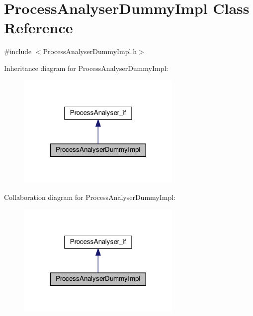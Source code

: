 \hypertarget{class_process_analyser_dummy_impl}{}\section{Process\+Analyser\+Dummy\+Impl Class Reference}
\label{class_process_analyser_dummy_impl}


{\ttfamily \#include $<$Process\+Analyser\+Dummy\+Impl.\+h$>$}



Inheritance diagram for Process\+Analyser\+Dummy\+Impl\+:\nopagebreak
\begin{figure}[H]
\begin{center}
\leavevmode
\includegraphics[width=224pt]{class_process_analyser_dummy_impl__inherit__graph}
\end{center}
\end{figure}


Collaboration diagram for Process\+Analyser\+Dummy\+Impl\+:\nopagebreak
\begin{figure}[H]
\begin{center}
\leavevmode
\includegraphics[width=224pt]{class_process_analyser_dummy_impl__coll__graph}
\end{center}
\end{figure}
